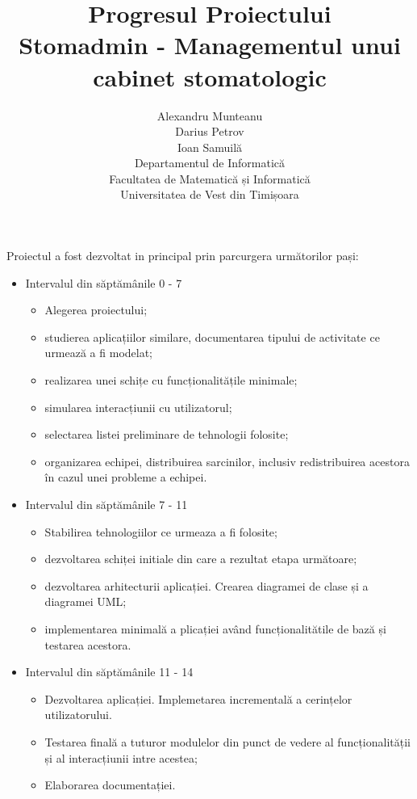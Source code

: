 \documentclass[a4paper,12pt]{article}
\title{Progresul Proiectului\\
Stomadmin - Managementul unui cabinet stomatologic}
\author{Alexandru Munteanu\\
Darius Petrov\\
Ioan Samuilă\\
Departamentul de Informatică\\
Facultatea de Matematică și Informatică\\
Universitatea de Vest din Timișoara}
\date{}
\begin{document}
\maketitle

\pagebreak

Proiectul a fost dezvoltat in principal prin parcurgera următorilor pași:

\begin{itemize}
\item Intervalul din săptămânile 0  - 7
\begin{itemize}
\item Alegerea proiectului;
\item studierea aplicațiilor similare, documentarea tipului de activitate ce urmează a fi modelat;
\item realizarea unei schițe cu funcționalitățile minimale;
\item simularea interacțiunii cu utilizatorul;
\item selectarea listei preliminare de tehnologii folosite;
\item organizarea echipei, distribuirea sarcinilor, inclusiv redistribuirea acestora în cazul unei probleme a echipei.
\end{itemize}
\item Intervalul din săptămânile 7 - 11
\begin{itemize}
\item Stabilirea tehnologiilor ce urmeaza a fi folosite;
\item dezvoltarea schiței initiale din care a rezultat etapa următoare;
\item dezvoltarea arhitecturii aplicației. Crearea diagramei de clase și a diagramei UML;
\item implementarea minimală a plicației având funcționalitătile de bază și testarea acestora.
\end{itemize}
\item Intervalul din săptămânile 11 - 14
\begin{itemize}
\item Dezvoltarea aplicației. Implemetarea incrementală a cerințelor utilizatorului.
\item Testarea finală a tuturor modulelor din punct de vedere al funcționalității și al interacțiunii intre acestea;
\item Elaborarea documentației.
\end{itemize}
\end{itemize}
\end{document}
